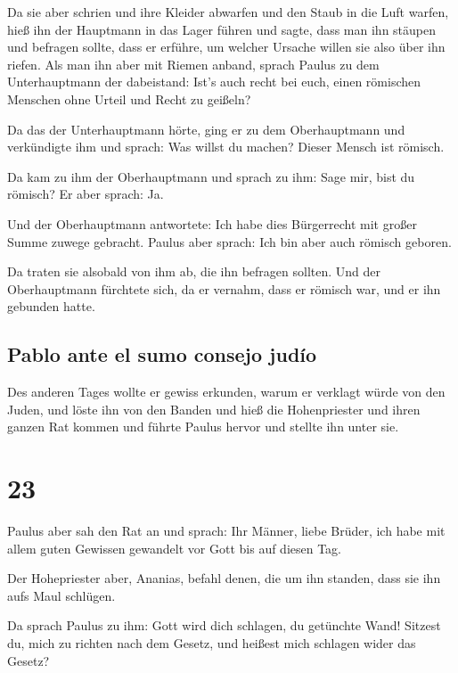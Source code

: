  Da sie aber schrien und ihre Kleider abwarfen und den
Staub in die Luft warfen,  hieß ihn der Hauptmann in das
Lager führen und sagte, dass man ihn stäupen und befragen sollte, dass
er erführe, um welcher Ursache willen sie also über ihn riefen.
 Als man ihn aber mit Riemen anband, sprach Paulus zu dem
Unterhauptmann der dabeistand: Ist's auch recht bei euch, einen
römischen Menschen ohne Urteil und Recht zu geißeln?

 Da das der Unterhauptmann hörte, ging er zu dem
Oberhauptmann und verkündigte ihm und sprach: Was willst du machen?
Dieser Mensch ist römisch.

 Da kam zu ihm der Oberhauptmann und sprach zu ihm: Sage
mir, bist du römisch? Er aber sprach: Ja.

 Und der Oberhauptmann antwortete: Ich habe dies
Bürgerrecht mit großer Summe zuwege gebracht. Paulus aber sprach: Ich
bin aber auch römisch geboren.

 Da traten sie alsobald von ihm ab, die ihn befragen
sollten. Und der Oberhauptmann fürchtete sich, da er vernahm, dass er
römisch war, und er ihn gebunden hatte.

\hypertarget{pablo-ante-el-sumo-consejo-juduxedo}{%
\subsection{Pablo ante el sumo consejo
judío}\label{pablo-ante-el-sumo-consejo-juduxedo}}

 Des anderen Tages wollte er gewiss erkunden, warum er
verklagt würde von den Juden, und löste ihn von den Banden und hieß die
Hohenpriester und ihren ganzen Rat kommen und führte Paulus hervor und
stellte ihn unter sie.

\hypertarget{section-22}{%
\section{23}\label{section-22}}

 Paulus aber sah den Rat an und sprach: Ihr Männer, liebe
Brüder, ich habe mit allem guten Gewissen gewandelt vor Gott bis auf
diesen Tag.

 Der Hohepriester aber, Ananias, befahl denen, die um ihn
standen, dass sie ihn aufs Maul schlügen.

 Da sprach Paulus zu ihm: Gott wird dich schlagen, du
getünchte Wand! Sitzest du, mich zu richten nach dem Gesetz, und heißest
mich schlagen wider das Gesetz?

